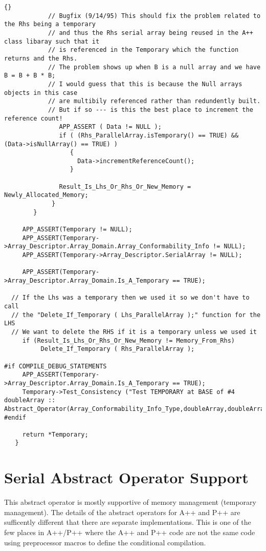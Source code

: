 \documentclass[10pt]{llncs}
\begin{document}
\begin{lstlisting}{}
            // Bugfix (9/14/95) This should fix the problem related to the Rhs being a temporary
            // and thus the Rhs serial array being reused in the A++ class libaray such that it
            // is referenced in the Temporary which the function returns and the Rhs.
            // The problem shows up when B is a null array and we have B = B + B * B;
            // I would guess that this is because the Null arrays objects in this case
            // are multibily referenced rather than redundently built.
            // But if so --- is this the best place to increment the reference count!
               APP_ASSERT ( Data != NULL );
               if ( (Rhs_ParallelArray.isTemporary() == TRUE) && (Data->isNullArray() == TRUE) )
                  {
                    Data->incrementReferenceCount();
                  }

               Result_Is_Lhs_Or_Rhs_Or_New_Memory = Newly_Allocated_Memory;
             }
        }

     APP_ASSERT(Temporary != NULL);
     APP_ASSERT(Temporary->Array_Descriptor.Array_Domain.Array_Conformability_Info != NULL);
     APP_ASSERT(Temporary->Array_Descriptor.SerialArray != NULL);

     APP_ASSERT(Temporary->Array_Descriptor.Array_Domain.Is_A_Temporary == TRUE);

  // If the Lhs was a temporary then we used it so we don't have to call
  // the "Delete_If_Temporary ( Lhs_ParallelArray );" function for the LHS
  // We want to delete the RHS if it is a temporary unless we used it
     if (Result_Is_Lhs_Or_Rhs_Or_New_Memory != Memory_From_Rhs)
          Delete_If_Temporary ( Rhs_ParallelArray );

#if COMPILE_DEBUG_STATEMENTS
     APP_ASSERT(Temporary->Array_Descriptor.Array_Domain.Is_A_Temporary == TRUE);
     Temporary->Test_Consistency ("Test TEMPORARY at BASE of #4 doubleArray :: Abstract_Operator(Array_Conformability_Info_Type,doubleArray,doubleArray,doubleSerialArray)");
#endif

     return *Temporary;
   }
\end{lstlisting}

\newpage
\section{Serial Abstract Operator Support}

   This abstract operator is mostly supportive of memory management (temporary management).
The details of the abstract operators for A++ and P++ are sufficently different that there
are separate implementations.  This is one of the few places in A++/P++ where the A++ and P++
code are not the same code using preprocessor macros to define the conditional compilation.
\end{document}
